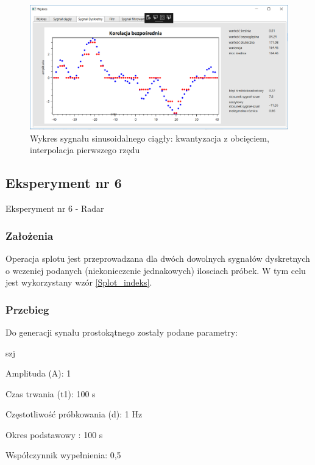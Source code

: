 \documentclass[12pt]{article}
\begin{document}
\newpage
\begin{figure}[h!]
 \centering
 \includegraphics[width=12.3cm]{korBD.PNG}
 \vspace{-0.3cm}
 \caption{Wykres sygnału sinusoidalnego ciągły: kwantyzacja z obcięciem, interpolacja pierwszego rzędu}
 \label{Wykres dla wynikw eksperymentu pierwszego}
\end{figure}


\subsection{Eksperyment nr 6}

Eksperyment nr 6 - Radar\\

\subsubsection{Założenia}
Operacja splotu jest przeprowadzana dla dwóch dowolnych sygnałów dyskretnych o wczeniej podanych (niekonieczcnie jednakowych) ilosciach próbek. W tym celu jest wykorzystany wzór \ref{Splot_indeks}.

\subsubsection{Przebieg}
Do generacji synału prostokątnego zostały podane parametry:

\begin{labeling}{szj}
\item [Amplituda (A):] 1
\item [Czas trwania (t1):] 100 s
\item [Częstotliwość próbkowania (d): ] 1 Hz
\item [Okres podstawowy :] 100 s
\item [Współczynnik wypełnienia:] 0,5
\end{labeling}
\end{document}

